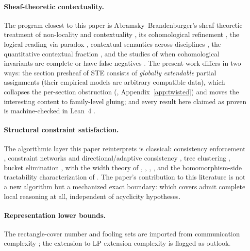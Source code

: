 \documentclass[11pt]{article}
\begin{document}
\paragraph{Sheaf-theoretic contextuality.}  The program closest to
this paper is Abramsky--Brandenburger's sheaf-theoretic treatment of
non-locality and contextuality \citep{abramsky2011sheaf}, its
cohomological refinement \citep{abramsky2012cohomology}, the logical
reading via paradox \citep{abramsky2015paradox}, contextual semantics
across disciplines \citep{abramsky2014contextualsemantics}, the
quantitative contextual fraction \citep{abramsky2017contextualfraction},
and the studies of when cohomological invariants are complete or have
false negatives
\citep{caru2017cohomology,caru2018complete,okay2017topological,aasnaess2022comparing}.
The present work differs in two ways: the section presheaf of STE
consists of \emph{globally extendable} partial assignments (their
empirical models are arbitrary compatible data), which collapses the
per-section obstruction (,
Appendix~\ref{app:twisted}) and moves the interesting content to
family-level gluing; and every result here claimed as proven is
machine-checked in Lean~4 \citep{moura2021,mathlib2020}.

\paragraph{Structural constraint satisfaction.}  The
algorithmic layer this paper reinterprets is classical: consistency
enforcement \citep{mackworth1977consistency,freuder1982backtrack},
constraint networks and directional/adaptive consistency
\citep{dechterpearl1987network}, tree clustering
\citep{dechterpearl1989tree}, bucket elimination
\citep{dechter1999bucket,dechter2003constraint}, with the width
theory of \citet{bertele1972nonserial},
\citet{robertson1986graphminorsII}, \citet{arnborg1987complexity},
\citet{bodlaender1998arboretum}, and the homomorphism-side
tractability characterization of \citet{grohe2007complexity}.  The
paper's contribution to this literature is not a new algorithm but a
mechanized exact boundary: which covers admit complete local
reasoning at all, independent of acyclicity hypotheses.

\paragraph{Representation lower bounds.}  The rectangle-cover
number and fooling sets are imported from communication complexity
\citep{kushilevitz1997communication,aho1983notions}; the extension to
LP extension complexity
\citep{yannakakis1991expressing,fiorini2015exponential} is flagged as
outlook.
\end{document}
